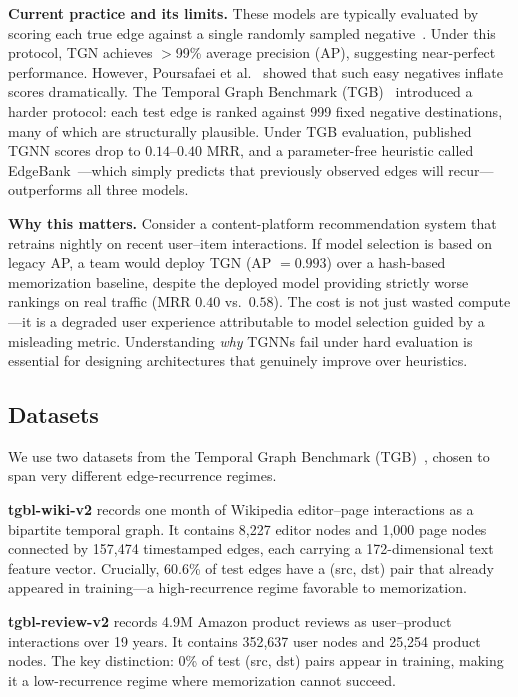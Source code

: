 \documentclass[10pt,twocolumn]{article}
\begin{document}
\textbf{Current practice and its limits.}
These models are typically evaluated by scoring each true edge against a single randomly sampled negative~\cite{zhou2022tgl}.
Under this protocol, TGN achieves $>$99\% average precision (AP), suggesting near-perfect performance.
However, Poursafaei et al.~\cite{poursafaei2022dgb} showed that such easy negatives inflate scores dramatically.
The Temporal Graph Benchmark (TGB)~\cite{huang2024tgb} introduced a harder protocol: each test edge is ranked against 999 fixed negative destinations, many of which are structurally plausible.
Under TGB evaluation, published TGNN scores drop to $0.14$--$0.40$ MRR, and a parameter-free heuristic called EdgeBank~\cite{poursafaei2022dgb}---which simply predicts that previously observed edges will recur---outperforms all three models.

\textbf{Why this matters.}
Consider a content-platform recommendation system that retrains nightly on recent user--item interactions.
If model selection is based on legacy AP, a team would deploy TGN (AP $= 0.993$) over a hash-based memorization baseline, despite the deployed model providing strictly worse rankings on real traffic (MRR $0.40$ vs.\ $0.58$).
The cost is not just wasted compute---it is a degraded user experience attributable to model selection guided by a misleading metric.
Understanding \emph{why} TGNNs fail under hard evaluation is essential for designing architectures that genuinely improve over heuristics.

\subsection{Datasets}

We use two datasets from the Temporal Graph Benchmark (TGB)~\cite{huang2024tgb}, chosen to span very different edge-recurrence regimes.

\textbf{tgbl-wiki-v2} records one month of Wikipedia editor--page interactions as a bipartite temporal graph.
It contains 8,227 editor nodes and 1,000 page nodes connected by 157,474 timestamped edges, each carrying a 172-dimensional text feature vector.
Crucially, 60.6\% of test edges have a (src, dst) pair that already appeared in training---a high-recurrence regime favorable to memorization.

\textbf{tgbl-review-v2} records 4.9M Amazon product reviews as user--product interactions over 19 years.
It contains 352,637 user nodes and 25,254 product nodes.
The key distinction: 0\% of test (src, dst) pairs appear in training, making it a low-recurrence regime where memorization cannot succeed.
\end{document}
